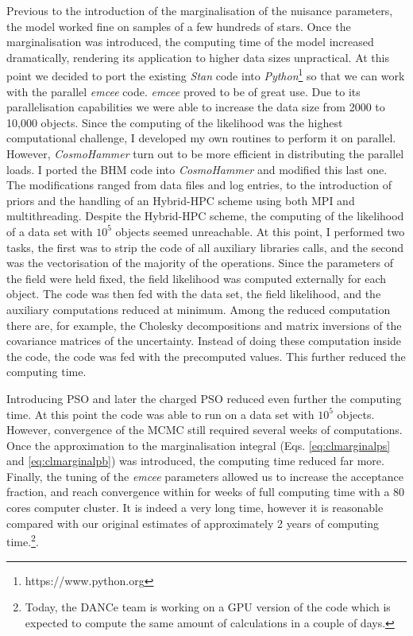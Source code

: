 Previous to the introduction of the marginalisation of the nuisance parameters, the model worked fine on samples of a few hundreds of stars. Once the marginalisation was introduced, the computing time of the model increased dramatically, rendering its application to higher data sizes unpractical. At this point we decided to port the existing \emph{Stan} code into \emph
{Python}\footnote{https://www.python.org} so that we can work with the parallel \emph{emcee} code. \emph{emcee} proved to be of great use. Due to its parallelisation capabilities we were able to increase the data size from 2000 to 10,000 objects. Since the computing of the likelihood was the highest computational challenge, I developed my own routines to perform it on parallel. However, \emph{CosmoHammer} \citep{Akeret2013} turn out to be more efficient in distributing the parallel loads. I ported the BHM code into \emph{CosmoHammer} and modified this last one. The modifications ranged from data files and log entries, to the introduction of priors and the handling of an Hybrid-HPC scheme using both MPI and multithreading. Despite the Hybrid-HPC scheme, the computing of the likelihood of a data set with $10^5$ objects seemed unreachable. At this point, I performed two tasks, the first was to strip the code of all auxiliary libraries calls, and the second was the vectorisation of the majority of the operations. Since the parameters of the field were held fixed, the field likelihood was computed externally for each object. The code was then fed with the data set, the field likelihood, and the auxiliary computations reduced at minimum. Among the reduced computation there are, for example, the Cholesky decompositions and matrix inversions of the covariance matrices of the uncertainty. Instead of doing these computation inside the code, the code was fed with the precomputed values. This further reduced the computing time.

Introducing PSO and later the charged PSO reduced even further the computing time.  At this point the code was able to run on a data set with $10^5$ objects. However, convergence of the MCMC still required several weeks of computations. Once the approximation to the marginalisation integral (Eqs. \ref{eq:clmarginalps} and \ref{eq:clmarginalpb}) was introduced, the computing time reduced far more. Finally, the tuning of the \emph{emcee} parameters allowed us to increase the acceptance fraction, and reach convergence within for weeks of full computing time with a 80 cores computer cluster. It is indeed a very long time, however it is reasonable compared with our original estimates of approximately 2 years of computing time.\footnote{Today, the DANCe team is working on a GPU version of the code which is expected to compute the same amount of calculations in a couple of days.}.

